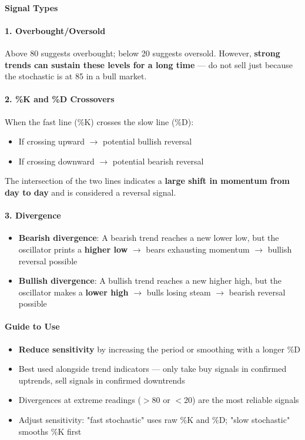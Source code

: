 \documentclass[12pt,openany]{book}
\begin{document}
\paragraph{Signal Types}

\paragraph{1. Overbought/Oversold}
Above 80 suggests overbought; below 20 suggests oversold. However, \textbf{strong trends can sustain these levels for a long time} --- do not sell just because the stochastic is at 85 in a bull market.

\paragraph{2. \%K and \%D Crossovers}
When the fast line (\%K) crosses the slow line (\%D):
\begin{itemize}[leftmargin=*]
    \item If crossing upward \(\rightarrow\) potential bullish reversal
    \item If crossing downward \(\rightarrow\) potential bearish reversal
\end{itemize}

The intersection of the two lines indicates a \textbf{large shift in momentum from day to day} and is considered a reversal signal.

\paragraph{3. Divergence}
\begin{itemize}[leftmargin=*]
    \item \textbf{Bearish divergence}: A bearish trend reaches a new lower low, but the oscillator prints a \textbf{higher low} \(\rightarrow\) bears exhausting momentum \(\rightarrow\) bullish reversal possible
    \item \textbf{Bullish divergence}: A bullish trend reaches a new higher high, but the oscillator makes a \textbf{lower high} \(\rightarrow\) bulls losing steam \(\rightarrow\) bearish reversal possible
\end{itemize}

\paragraph{Guide to Use}
\begin{itemize}[leftmargin=*]
    \item \textbf{Reduce sensitivity} by increasing the period or smoothing with a longer \%D
    \item Best used alongside trend indicators --- only take buy signals in confirmed uptrends, sell signals in confirmed downtrends
    \item Divergences at extreme readings (\(>\)80 or \(<\)20) are the most reliable signals
    \item Adjust sensitivity: "fast stochastic" uses raw \%K and \%D; "slow stochastic" smooths \%K first
\end{itemize}
\end{document}
